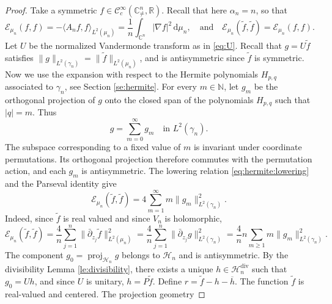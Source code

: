 \documentclass[11pt,reqno]{amsart}
\numberwithin{equation}{section}%
\numberwithin{figure}{section}%
\numberwithin{table}{section}
\theoremstyle{plain}
\theoremstyle{definition}
\begin{document}
\begin{proof}
  Take a symmetric $f\in\mathcal{C}^\infty_c(\mathbb{C}^n_{\neq},\mathbb{R})$.
  Recall that here $\alpha_n=n$, so that
  \begin{equation}\label{eq:EfA}
    \mathcal{E}_{\mu_n}(f,f)=-\langle
    A_nf,f\rangle_{L^2(\mu_n)}=\frac{1}{n}\int_{\mathbb{C}^n}|\nabla
    f|^2\,\mathrm{d}\mu_n,\quad\text{and}\quad
    \mathcal{E}_{\mu_n}(\widetilde f,\widetilde f)=\mathcal{E}_{\mu_n}(f,f).
  \end{equation}
  Let $U$ be the normalized Vandermonde transform as in \eqref{eq:U}. Recall
  that $g=U\widetilde f$ satisfies
  $\|g\|_{L^2(\gamma_n)}=\|\widetilde f\|_{L^2(\mu_n)}$, and is antisymmetric
  since $\widetilde f$ is symmetric. Now we use the expansion with respect to
  the Hermite polynomials $H_{p,q}$ associated to $\gamma_n$, see Section
  \ref{se:hermite}. For every $m\in\mathbb{N}$, let $g_m$ be the orthogonal
  projection of $g$ onto the closed span of the polynomials $H_{p,q}$ such
  that $|q|=m$. Thus
  \begin{equation}\label{eq:gamma-two-hermite-decomposition}
    g=\sum_{m=0}^{\infty}g_m
    \quad\text{in }L^2(\gamma_n).
  \end{equation}
  The subspace corresponding to a fixed value of $m$ is invariant under
  coordinate permutations. Its orthogonal projection therefore commutes with
  the permutation action, and each $g_m$ is antisymmetric. The lowering
  relation \eqref{eq:hermite:lowering} and the Parseval identity give
  \begin{equation}\label{eq:gamma-two-hermite-energy}
    \mathcal{E}_{\mu_n}(\widetilde f,\widetilde f)
    =4\sum_{m=1}^{\infty}m\|g_m\|_{L^2(\gamma_n)}^2.
  \end{equation}
  Indeed, since $\widetilde{f}$ is real valued and since $V_n$ is holomorphic,
  \begin{equation}
    \mathcal{E}_{\mu_n}(\widetilde f,\widetilde f)
    =\frac{4}{n}\sum_{j=1}^n\|\bar\partial_{z_j}\widetilde f\|_{L^2(\mu_n)}^2
    =\frac{4}{n}\sum_{j=1}^n\|\bar\partial_{z_j}g\|_{L^2(\gamma_n)}^2
    =\frac{4}{n}n\sum_{m\geq1}m\|g_m\|_{L^2(\gamma_n)}^2.
  \end{equation}
  The component $g_0=\operatorname{proj}_{\mathcal{H}_n}g$ belongs to
  $\mathcal{H}_n$ and is antisymmetric. By the divisibility Lemma
  \ref{le:divisibility}, there exists a unique
  $h\in\mathcal{H}_n^{\mathrm{div}}$ such that $g_0=Uh$, and since $U$ is
  unitary, $h=P\widetilde f$. Define $r=\widetilde f-h-\overline h$. The
  function $\widetilde f$ is real-valued and centered. The projection geometry

\end{proof}
\end{document}
